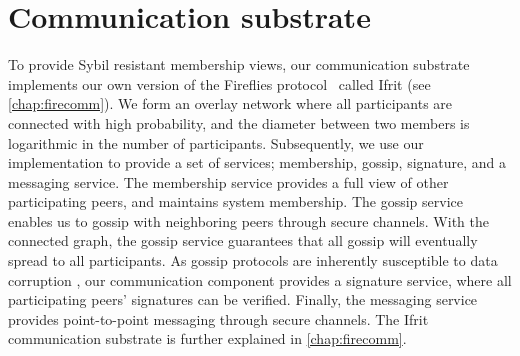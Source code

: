 \documentclass[USenglish]{uit-thesis}
\begin{document}
\section{Communication substrate}
To provide Sybil resistant membership views, our communication substrate implements our own version of the Fireflies protocol~\cite{flies, flies2} called Ifrit (see \autoref{chap:firecomm}).
We form an overlay network where all participants are connected with high probability, and the diameter between two members is logarithmic in the number of participants. 
Subsequently, we use our implementation to provide a set of services; membership, gossip, signature, and a messaging service.
The membership service provides a full view of other participating peers, and maintains system membership.
The gossip service enables us to gossip with neighboring peers through secure channels.
With the connected graph, the gossip service guarantees that all gossip will eventually spread to all participants.
As gossip protocols are inherently susceptible to data corruption \cite{gossip_promise}, our communication component provides a signature service, where all participating peers' signatures can be verified.
Finally, the messaging service provides point-to-point messaging through secure channels.
The Ifrit communication substrate is further explained in \autoref{chap:firecomm}.
  
  


\iffalse
\section{FireChain overview}
FireChain consensus is based on gossip based agreement, where participants vote for blocks and gossips vote tables. 
Internally, FireChain deploys a Ifrit client responsible for joining the specified Ifrit network and relaying all communication with other FireChain instances.
As the consensus protocol is based on gossip, relies on a full membership view, and establishing secure communication channels, we deem Ifrit a suitable network substrate due to its membership, gossip and signature services.
Ifrit provides a full \gls{bft} membership view, where the diameter between all live members is logarithmic in the number of participants.
Hence, we can utilize the underlying overlay network to disseminate our gossip.  
The overall architecture is shown in \autoref{fig:firechain}.
By leveraging Ifrit's membership and gossip service, we have a dynamic full membership view with gossip convergence guarantees for our vote table reconciliation.
Our implementation is both oblivious to how messages are propagated and how the membership is maintained.
As a result, our implementation was simplified by leveraging Ifrit's capabilities.
\fi
\end{document}
